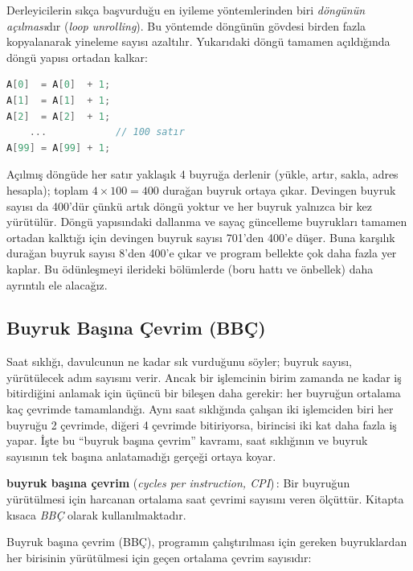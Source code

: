 Derleyicilerin sıkça başvurduğu en iyileme yöntemlerinden biri \emph{döngünün açılması}dır (\textit{loop unrolling}). Bu yöntemde döngünün gövdesi birden fazla kopyalanarak yineleme sayısı azaltılır. Yukarıdaki döngü tamamen açıldığında döngü yapısı ortadan kalkar:

\begin{lstlisting}[language=C]
A[0]  = A[0]  + 1;
A[1]  = A[1]  + 1;
A[2]  = A[2]  + 1;
    ...            // 100 satır
A[99] = A[99] + 1;
\end{lstlisting}

Açılmış döngüde her satır yaklaşık 4 buyruğa derlenir (yükle, artır, sakla, adres hesapla); toplam $4 \times 100 = 400$ durağan buyruk ortaya çıkar. Devingen buyruk sayısı da 400'dür çünkü artık döngü yoktur ve her buyruk yalnızca bir kez yürütülür. Döngü yapısındaki dallanma ve sayaç güncelleme buyrukları tamamen ortadan kalktığı için devingen buyruk sayısı 701'den 400'e düşer. Buna karşılık durağan buyruk sayısı 8'den 400'e çıkar ve program bellekte çok daha fazla yer kaplar. Bu ödünleşmeyi ilerideki bölümlerde (boru hattı ve önbellek) daha ayrıntılı ele alacağız.

\subsection{Buyruk Başına Çevrim (BBÇ)}
\label{subsec:bbc}

Saat sıklığı, davulcunun ne kadar sık vurduğunu söyler; buyruk sayısı, yürütülecek adım sayısını verir. Ancak bir işlemcinin birim zamanda ne kadar iş bitirdiğini anlamak için üçüncü bir bileşen daha gerekir: her buyruğun ortalama kaç çevrimde tamamlandığı. Aynı saat sıklığında çalışan iki işlemciden biri her buyruğu 2 çevrimde, diğeri 4 çevrimde bitiriyorsa, birincisi iki kat daha fazla iş yapar. İşte bu ``buyruk başına çevrim'' kavramı, saat sıklığının ve buyruk sayısının tek başına anlatamadığı gerçeği ortaya koyar.

\begin{terimnotu}
\textbf{buyruk başına çevrim} (\emph{cycles per instruction, CPI})\,: Bir buyruğun yürütülmesi için harcanan ortalama saat çevrimi sayısını veren ölçüttür. Kitapta kısaca \emph{BBÇ} olarak kullanılmaktadır.
\end{terimnotu}

Buyruk başına çevrim (BBÇ), programın çalıştırılması için gereken buyruklardan her birisinin yürütülmesi için geçen ortalama çevrim sayısıdır:

